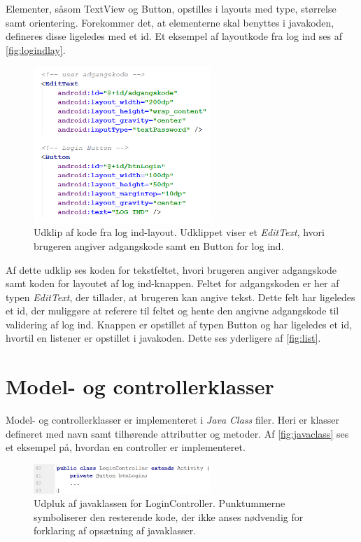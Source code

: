 Elementer, såsom TextView og Button, opstilles i layouts med type, størrelse samt orientering. Forekommer det, at elementerne skal benyttes i javakoden, defineres disse ligeledes med et id. Et eksempel af layoutkode fra log ind ses af \autoref{fig:logindlay}.

\begin{figure} [H]
\centering
\includegraphics[width=0.6\textwidth]{figures/imple/logindlay}
\caption{Udklip af kode fra log ind-layout. Udklippet viser et \textit{EditText}, hvori brugeren angiver adgangskode samt en Button for log ind.}
\label{fig:logindlay}
\end{figure}

\noindent
Af dette udklip ses koden for tekstfeltet, hvori brugeren angiver adgangskode samt koden for layoutet af log ind-knappen. Feltet for adgangskoden er her af typen \textit{EditText}, der tillader, at brugeren kan angive tekst. Dette felt har ligeledes et id, der muliggøre at referere til feltet og hente den angivne adgangskode til validering af log ind. Knappen er opstillet af typen Button og har ligeledes et id, hvortil en listener er opstillet i javakoden. Dette ses yderligere af \autoref{fig:list}.

\section{Model- og controllerklasser} \label{sec:impmodelcon}
Model- og controllerklasser er implementeret i \textit{Java Class} filer. Heri er klasser defineret med navn samt tilhørende attributter og metoder. Af \autoref{fig:javaclass} ses et eksempel på, hvordan en controller er implementeret. 

\begin{figure} [H]
\centering
\includegraphics[width=0.6\textwidth]{figures/imple/javaclass}
\caption{Udpluk af javaklassen for LoginController. Punktummerne symboliserer den resterende kode, der ikke anses nødvendig for forklaring af opsætning af javaklasser.}
\label{fig:javaclass}
\end{figure}

